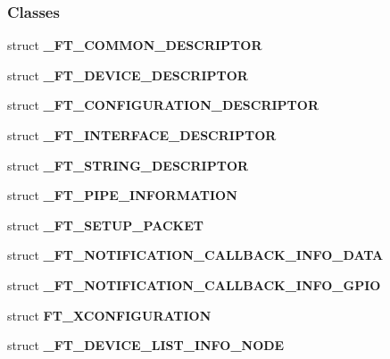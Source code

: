 \subsubsection*{Classes}
\begin{DoxyCompactItemize}
\item 
struct {\bf \+\_\+\+F\+T\+\_\+\+C\+O\+M\+M\+O\+N\+\_\+\+D\+E\+S\+C\+R\+I\+P\+T\+OR}
\item 
struct {\bf \+\_\+\+F\+T\+\_\+\+D\+E\+V\+I\+C\+E\+\_\+\+D\+E\+S\+C\+R\+I\+P\+T\+OR}
\item 
struct {\bf \+\_\+\+F\+T\+\_\+\+C\+O\+N\+F\+I\+G\+U\+R\+A\+T\+I\+O\+N\+\_\+\+D\+E\+S\+C\+R\+I\+P\+T\+OR}
\item 
struct {\bf \+\_\+\+F\+T\+\_\+\+I\+N\+T\+E\+R\+F\+A\+C\+E\+\_\+\+D\+E\+S\+C\+R\+I\+P\+T\+OR}
\item 
struct {\bf \+\_\+\+F\+T\+\_\+\+S\+T\+R\+I\+N\+G\+\_\+\+D\+E\+S\+C\+R\+I\+P\+T\+OR}
\item 
struct {\bf \+\_\+\+F\+T\+\_\+\+P\+I\+P\+E\+\_\+\+I\+N\+F\+O\+R\+M\+A\+T\+I\+ON}
\item 
struct {\bf \+\_\+\+F\+T\+\_\+\+S\+E\+T\+U\+P\+\_\+\+P\+A\+C\+K\+ET}
\item 
struct {\bf \+\_\+\+F\+T\+\_\+\+N\+O\+T\+I\+F\+I\+C\+A\+T\+I\+O\+N\+\_\+\+C\+A\+L\+L\+B\+A\+C\+K\+\_\+\+I\+N\+F\+O\+\_\+\+D\+A\+TA}
\item 
struct {\bf \+\_\+\+F\+T\+\_\+\+N\+O\+T\+I\+F\+I\+C\+A\+T\+I\+O\+N\+\_\+\+C\+A\+L\+L\+B\+A\+C\+K\+\_\+\+I\+N\+F\+O\+\_\+\+G\+P\+IO}
\item 
struct {\bf F\+T\+\_\+X\+C\+O\+N\+F\+I\+G\+U\+R\+A\+T\+I\+ON}
\item 
struct {\bf \+\_\+\+F\+T\+\_\+\+D\+E\+V\+I\+C\+E\+\_\+\+L\+I\+S\+T\+\_\+\+I\+N\+F\+O\+\_\+\+N\+O\+DE}
\end{DoxyCompactItemize}
